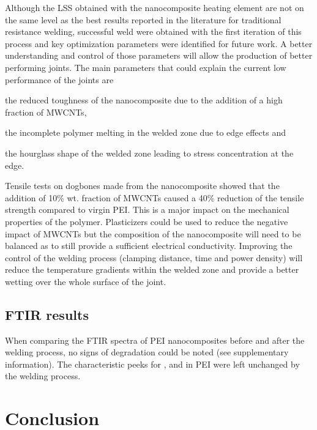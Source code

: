 \documentclass[11pt,review,times]{elsarticle}
\begin{document}
Although the LSS obtained with the nanocomposite heating element are not on the same level as the best results reported in the literature for traditional resistance welding, successful weld were obtained with the first iteration of this process and key optimization parameters were identified for future work. 
A better understanding and control of those parameters will allow the production of better performing joints. 
The main parameters that could explain the current low performance of the joints are \begin{enumerate*}[label=(\arabic*)]
	\item the reduced toughness of the nanocomposite due to the addition of a high fraction of MWCNTs,
	\item the incomplete polymer melting in the welded zone due to edge effects and
	\item the hourglass shape of the welded zone leading to stress concentration at the edge. 
\end{enumerate*}
Tensile tests on dogbones made from the nanocomposite showed that the addition of 10\% wt. fraction of MWCNTs caused a 40\% reduction of the tensile strength compared to virgin PEI. 
This is a major impact on the mechanical properties of the polymer. 
Plasticizers could be used to reduce the negative impact of MWCNTs but the composition of the nanocomposite will need to be balanced as to still provide a sufficient electrical conductivity. 
Improving the control of the welding process (clamping distance, time and power density) will reduce the temperature gradients within the welded zone and provide a better wetting over the whole surface of the joint. 

\subsection{FTIR results}

When comparing the FTIR spectra of PEI nanocomposites before and after the welding process, no signs of degradation could be noted (see supplementary information). 
The characteristic peeks for ,  and  in PEI were left unchanged by the welding process. 

							\section{Conclusion}
\end{document}
